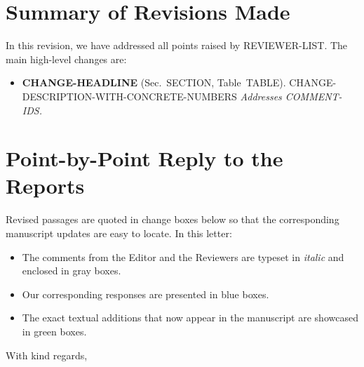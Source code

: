 \documentclass[a4paper,twoside,11pt]{article}
\begin{document}
\section*{Summary of Revisions Made}

In this revision, we have addressed all points raised by {{REVIEWER-LIST}}. The main high-level changes are:

%
\begin{itemize}[leftmargin=*, topsep=2pt, itemsep=2pt]
    \item \textbf{{{CHANGE-HEADLINE}}} (Sec.~{{SECTION}}, Table~{{TABLE}}). {{CHANGE-DESCRIPTION-WITH-CONCRETE-NUMBERS}} \emph{Addresses {{COMMENT-IDS}}.}
\end{itemize}

\section*{Point-by-Point Reply to the Reports}

Revised passages are quoted in change boxes below so that the corresponding manuscript updates are easy to locate. In this letter:
\begin{itemize}[leftmargin=*, topsep=2pt, itemsep=1pt]
    \item The comments from the Editor and the Reviewers are typeset in \textit{italic} and enclosed in {\color{pantonegray}gray boxes}.
    \item Our corresponding responses are presented in {\color{pantoneblue}blue boxes}.
    \item The exact textual additions that now appear in the manuscript are showcased in {\color{pantonegreen}green boxes}.
\end{itemize}

\vspace{1em}
\noindent With kind regards,
\end{document}
